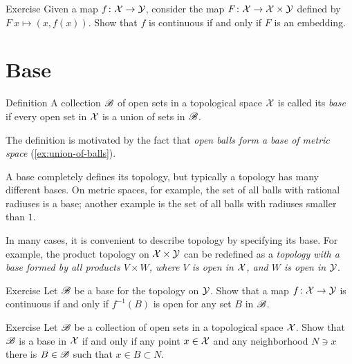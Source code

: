 \begin{thm}{Exercise}\label{ex:graph}
Given a map $f\:\c{X}\z\to \c{Y}$, consider the map $F\:\c{X}\z\to \c{X}\times\c{Y}$ defined by $F\:x\mapsto (x,f(x))$.
Show that $f$ is continuous if and only if $F$ is an embedding.
\end{thm}


\section{Base}

\begin{thm}{Definition}
A collection $\mathscr{B}$ of open sets in a topological space $\mathcal{X}$ is called its \emph{base} if every open set in $\mathcal{X}$ is a union of sets in $\mathscr{B}$.
\end{thm}

The definition is motivated by the fact that \textit{open balls form a base of metric space} (\ref{ex:union-of-balls}).

A base completely defines its topology,
but typically a topology has many different bases.
On metric spaces, for example, the set of all balls with rational radiuses is a base;
another example is the set of all  balls with radiuses smaller than $1$.

In many cases, it is convenient to describe topology by specifying its base.
For example, the product topology on $\mathcal{X}\times\mathcal{Y}$ can be redefined as a \textit{topology with a base formed by all products $V\times W$, where $V$ is open in $\mathcal{X}$, and $W$ is open in $\mathcal{Y}$}.

\begin{thm}{Exercise}\label{ex:base}
Let $\mathscr{B}$ be a base for the topology on $\mathcal{Y}$.
Show that a map $f\colon \mathcal{X} \to \mathcal{Y}$ is continuous if and only if $f^{-1}(B)$ is open for any set $B$ in $\mathscr{B}$.

\end{thm}



\begin{thm}{Exercise}\label{ex:base-nbhd}
Let $\mathscr{B}$ be a collection of open sets in a topological space $\mathcal{X}$.
Show that $\mathscr{B}$ is a base in $\mathcal{X}$ if and only if any point $x\in \mathcal{X}$ and any neighborhood $N\ni x$ there is $B\in  \mathscr{B}$ such that $x\in B\subset N$.
\end{thm}

